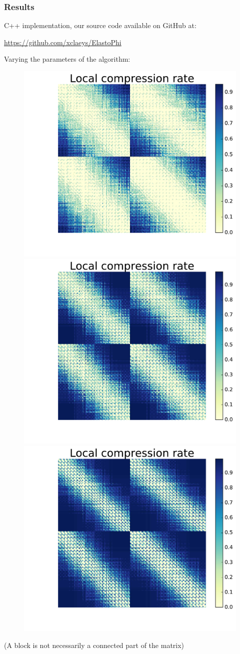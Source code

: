 \begin{frame}
\frametitle{Results}

C++ implementation, our source code available on GitHub at:
\begin{center}
\url{https://github.com/xclaeys/ElastoPhi}
\end{center}

Varying the parameters of the algorithm:
\vspace{-5pt}
\begin{figure}
\centering
\includegraphics[width=.33\textwidth]{../images/graphe_mapp_output_local_comp_1_0,9_matrice450Fracs.pdf}
\includegraphics[width=.33\textwidth]{../images/graphe_mapp_output_local_comp_10_0,9_matrice450Fracs.pdf}
\includegraphics[width=.33\textwidth]{../images/graphe_mapp_output_local_comp_10_1_matrice450Fracs.pdf}
\end{figure}

(A block is not necessarily a connected part of the matrix)
\end{frame}


